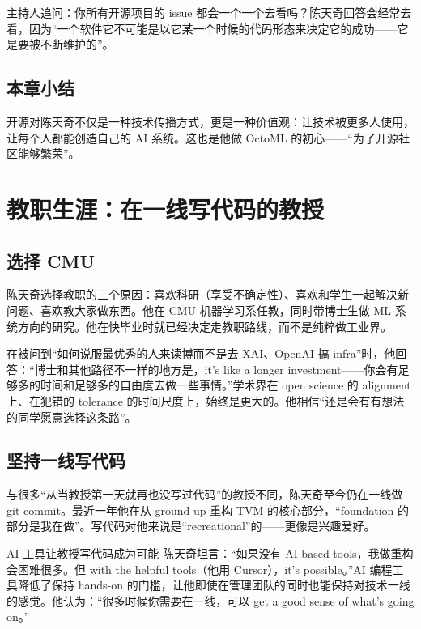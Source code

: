 \documentclass[a4paper]{article}
\begin{document}
主持人追问：你所有开源项目的 issue 都会一个一个去看吗？陈天奇回答会经常去看，因为``一个软件它不可能是以它某一个时候的代码形态来决定它的成功------它是要被不断维护的''。

\subsection{本章小结}

开源对陈天奇不仅是一种技术传播方式，更是一种价值观：让技术被更多人使用，让每个人都能创造自己的 AI 系统。这也是他做 OctoML 的初心------``为了开源社区能够繁荣''。

\section{教职生涯：在一线写代码的教授}

\subsection{选择 CMU}

陈天奇选择教职的三个原因：喜欢科研（享受不确定性）、喜欢和学生一起解决新问题、喜欢教大家做东西。他在 CMU 机器学习系任教，同时带博士生做 ML 系统方向的研究。他在快毕业时就已经决定走教职路线，而不是纯粹做工业界。

在被问到``如何说服最优秀的人来读博而不是去 XAI、OpenAI 搞 infra''时，他回答：``博士和其他路径不一样的地方是，it's like a longer investment------你会有足够多的时间和足够多的自由度去做一些事情。''学术界在 open science 的 alignment 上、在犯错的 tolerance 的时间尺度上，始终是更大的。他相信``还是会有有想法的同学愿意选择这条路''。

\subsection{坚持一线写代码}

与很多``从当教授第一天就再也没写过代码''的教授不同，陈天奇至今仍在一线做 git commit。最近一年他在从 ground up 重构 TVM 的核心部分，``foundation 的部分是我在做''。写代码对他来说是``recreational''的------更像是兴趣爱好。

\begin{knowledgebox}{AI 工具让教授写代码成为可能}
陈天奇坦言：``如果没有 AI based tools，我做重构会困难很多。但 with the helpful tools（他用 Cursor），it's possible。''AI 编程工具降低了保持 hands-on 的门槛，让他即使在管理团队的同时也能保持对技术一线的感觉。他认为：``很多时候你需要在一线，可以 get a good sense of what's going on。''
\end{knowledgebox}
\end{document}
